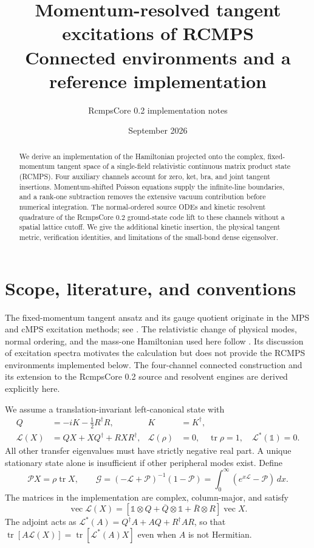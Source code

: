 \documentclass[11pt]{article}
\title{Momentum-resolved tangent excitations of RCMPS\\
Connected environments and a reference implementation}
\author{RcmpsCore 0.2 implementation notes}
\date{September 2026}
\newcommand{\tr}{\operatorname{tr}}
\newcommand{\Id}{\mathbb{1}}
\newcommand{\LL}{\mathcal{L}}
\newcommand{\PP}{\mathcal{P}}
\newcommand{\GG}{\mathcal{G}}
\begin{document}
\maketitle

\begin{abstract}
We derive an implementation of the Hamiltonian projected onto the complex,
fixed-momentum tangent space of a single-field relativistic continuous matrix
product state (RCMPS). Four auxiliary channels account for zero, ket, bra, and
joint tangent insertions. Momentum-shifted Poisson equations supply the
infinite-line boundaries, and a rank-one subtraction removes the extensive
vacuum contribution before numerical integration. The normal-ordered source
ODEs and kinetic resolvent quadrature of the RcmpsCore 0.2 ground-state code lift
to these channels without a spatial lattice cutoff. We give the additional
kinetic insertion, the physical tangent metric, verification identities, and
limitations of the small-bond dense eigensolver.
\end{abstract}

\section{Scope, literature, and conventions}
The fixed-momentum tangent ansatz and its gauge quotient originate in the MPS
and cMPS excitation methods; see \cite{haegeman,draxler,vanderstraeten}.
The relativistic change of physical modes, normal ordering, and the mass-one
Hamiltonian used here follow \cite{tilloy}. Its discussion of excitation
spectra motivates the calculation but does not provide the RCMPS environments
implemented below. The four-channel connected construction and its extension
to the RcmpsCore 0.2 source and resolvent engines are derived explicitly here.

We assume a translation-invariant left-canonical state with
\begin{align}
 Q&=-iK-\tfrac12R^\dagger R, & K&=K^\dagger,\\
 \LL(X)&=QX+XQ^\dagger+RXR^\dagger,
 &\LL(\rho)&=0,\quad \tr\rho=1,\quad \LL^*(\Id)=0.
\end{align}
All other transfer eigenvalues must have strictly negative real part. A
unique stationary state alone is insufficient if other peripheral modes
exist. Define
\begin{equation}
 \PP X=\rho\tr X,\qquad
 \GG=(-\LL+\PP)^{-1}(1-\PP)
       =\int_0^\infty(e^{x\LL}-\PP)\,dx.
 \label{eq:G}
\end{equation}
The matrices in the implementation are complex, column-major, and satisfy
\begin{equation}
 \operatorname{vec}\LL(X)=
 [\Id\otimes Q+\overline Q\otimes\Id+\overline R\otimes R]
 \operatorname{vec}X.
\end{equation}
The adjoint acts as
$\LL^*(A)=Q^\dagger A+AQ+R^\dagger AR$, so that
$\tr[A\LL(X)]=\tr[\LL^*(A)X]$ even when $A$ is not Hermitian.
\end{document}
